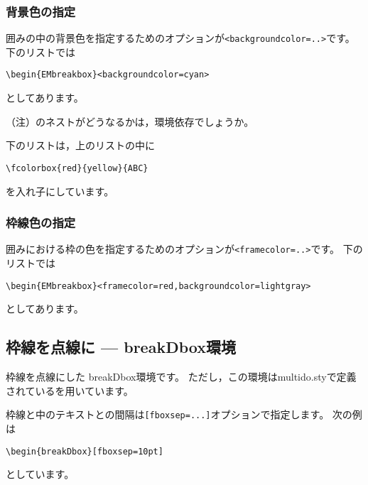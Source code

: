 \documentclass[a4j,fleqn]{jarticle}
\begin{document}


\subsubsection{背景色の指定}
囲みの中の背景色を指定するためのオプションが\verb+<backgroundcolor=..>+です。
下のリストでは
\begin{jquote}
\begin{verbatim}
\begin{EMbreakbox}<backgroundcolor=cyan>
\end{verbatim}
\end{jquote}
としてあります。
\bigskip



（注）のネストがどうなるかは，環境依存でしょうか。

下のリストは，上のリストの中に
\begin{jquote}
\begin{verbatim}
\fcolorbox{red}{yellow}{ABC}
\end{verbatim}
\end{jquote}
を入れ子にしています。
\bigskip



\subsubsection{枠線色の指定}
囲みにおける枠の色を指定するためのオプションが\verb+<framecolor=..>+です。
下のリストでは
\begin{jquote}
\begin{verbatim}
\begin{EMbreakbox}<framecolor=red,backgroundcolor=lightgray>
\end{verbatim}
\end{jquote}
としてあります。
\bigskip



\subsection{枠線を点線に --- \textsf{breakDbox}環境}

枠線を点線にした \textsf{breakDbox}環境です。
ただし，この環境は\textsf{multido.sty}で定義されているを用いています。
\bigskip


\bigskip

枠線と中のテキストとの間隔は\verb+[fboxsep=...]+オプションで指定します。
次の例は
\begin{jquote}
\begin{verbatim}
\begin{breakDbox}[fboxsep=10pt]
\end{verbatim}
\end{jquote}
としています。\bigskip
\end{document}
